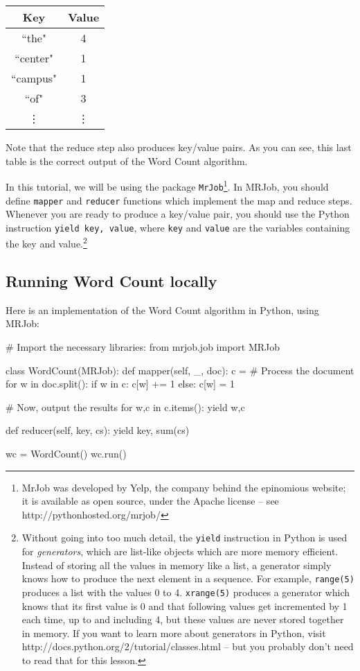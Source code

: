 \begin{center}
\begin{tabular}{|c|c|}
\hline
Key & Value \\
\hline\hline
``the" & 4 \\
``center" & 1 \\
``campus" & 1 \\
``of" & 3\\
\vdots & \vdots \\
\end{tabular}
\end{center}

Note that the reduce step also produces key/value pairs. As you can see, this last table is the correct output of the Word Count algorithm.

In this tutorial, we will be using the package \texttt{MrJob}\footnote{MrJob was developed by Yelp, the company behind the epinomious website; it is available
as open source, under the Apache license -- see http://pythonhosted.org/mrjob/}. In MRJob, you should define \texttt{mapper} and \texttt{reducer} functions which implement the map and reduce steps. Whenever you are ready to produce a key/value pair, you should use the Python instruction \texttt{yield key, value}, where \texttt{key} and \texttt{value} are the variables containing the key and value.\footnote{Without going into too much detail, the \texttt{yield} instruction in Python is used for \emph{generators}, which are list-like objects which are more memory efficient. Instead of storing all the values in memory like a list, a generator simply knows how to produce the next element in a sequence. For example, \texttt{range(5)} produces a list with the values 0 to 4. \texttt{xrange(5)} produces a generator which knows that its first value is 0 and that following values get incremented by 1 each time, up to and including 4, but these values are never stored together in memory. If you want to learn more about generators in Python, visit http://docs.python.org/2/tutorial/classes.html -- but you probably don't need to read that for this lesson.}

\subsection{Running Word Count locally}

Here is an implementation of the Word Count algorithm in Python, using MRJob:

\begin{python}
# Import the necessary libraries:
from mrjob.job import MRJob

class WordCount(MRJob):
    def mapper(self, _, doc):
        c = {}
        # Process the document
        for w in doc.split():
            if w in c:
                c[w] += 1
            else:
                c[w] = 1

        # Now, output the results
        for w,c in c.items():
            yield w,c

    def reducer(self, key, cs):
        yield key, sum(cs)

wc = WordCount()
wc.run()
\end{python}


